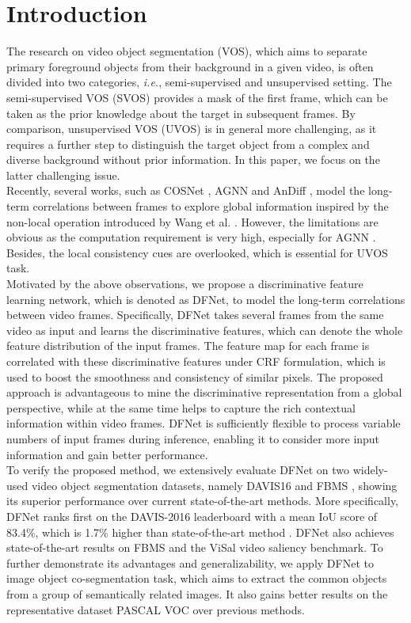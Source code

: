 \documentclass[runningheads]{llncs}
\begin{document}
\section{Introduction}

The research on video object segmentation (VOS),  which aims to  separate primary foreground objects from their background in a given video, is often divided into two categories, \emph{i.e.}, semi-supervised and unsupervised setting. The semi-supervised VOS (SVOS) provides a mask of the first frame, which can be taken as the prior knowledge about the target in subsequent frames.  By comparison, unsupervised VOS  (UVOS) is in general more challenging, as it requires a further step to distinguish the target object from a complex and diverse background without prior information. In this paper, we focus on the latter challenging issue.\\
\indent Recently, several works, such as COSNet \cite{vos_cosnet}, AGNN \cite{vos_agnn} and AnDiff \cite{vos_andiff},  model the long-term correlations  between frames to explore global information  inspired by the non-local operation introduced by Wang et al. \cite{nonlocal}. However, the limitations are obvious as the computation requirement is very high, especially for AGNN \cite{vos_agnn}. Besides,  the local consistency cues are overlooked, which is  essential for UVOS task. \\
\indent  Motivated by the above observations, we propose a discriminative feature learning network, which is denoted as DFNet, to model the long-term correlations between video frames. Specifically, DFNet takes several frames from the same video as input and learns the discriminative features, which can denote the whole feature distribution of the input frames. The feature map for each frame is correlated with these discriminative features under CRF formulation, which is used to boost the smoothness and consistency of similar pixels.  The proposed approach is advantageous to mine the discriminative representation from a global perspective, while at the same time helps to capture the rich contextual information within video frames. DFNet is sufficiently flexible to process variable numbers of input frames during inference, enabling it to consider more input information and gain better performance.\\
\indent  To verify the proposed method, we extensively evaluate DFNet on two widely-used video object segmentation datasets, namely DAVIS16 \cite{davis_16} and FBMS \cite{fbms}, showing its superior performance over current state-of-the-art methods. More specifically, DFNet ranks first  on the DAVIS-2016 leaderboard with a mean IoU score of 83.4\%, which is 1.7\% higher than state-of-the-art method \cite{vos_andiff}. DFNet also achieves state-of-the-art results on FBMS \cite{fbms} and the ViSal \cite{video_gafl} video saliency benchmark. To further demonstrate its advantages and generalizability, we apply DFNet to image object co-segmentation task, which aims to extract the common objects from a group of semantically related images. It also gains better results on the representative dataset PASCAL VOC  \cite{coseg_faktor13} over previous methods.\\
\end{document}
